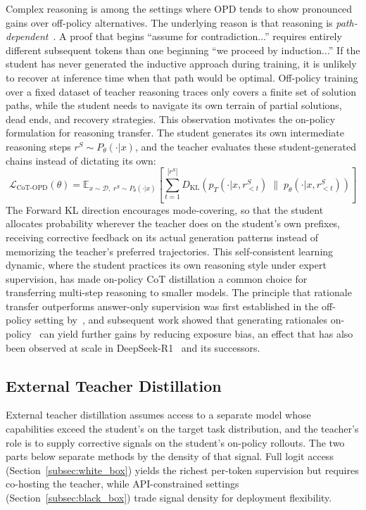 \documentclass{article} %
\newcommand{\E}{\mathbb{E}}
\newcommand{\KL}{D_{\mathrm{KL}}}
\newcommand{\ptheta}{p_\theta}
\newcommand{\pteacher}{p_T}
\newcommand{\loss}{\mathcal{L}}
\begin{document}
Complex reasoning is among the settings where OPD tends to show pronounced gains over off-policy alternatives. The underlying reason is that reasoning is \emph{path-dependent}~\citep{2306.13649}. A proof that begins ``assume for contradiction...'' requires entirely different subsequent tokens than one beginning ``we proceed by induction...'' If the student has never generated the inductive approach during training, it is unlikely to recover at inference time when that path would be optimal. Off-policy training over a fixed dataset of teacher reasoning traces only covers a finite set of solution paths, while the student needs to navigate its own terrain of partial solutions, dead ends, and recovery strategies. This observation motivates the on-policy formulation for reasoning transfer. The student generates its own intermediate reasoning steps $r^S \sim P_\theta(\cdot|x)$, and the teacher evaluates these student-generated chains instead of dictating its own:
\begin{equation*}
    \loss_{\text{CoT-OPD}}(\theta) = \E_{x \sim \mathcal{D},\; r^S \sim P_\theta(\cdot|x)} \left[ \sum_{t=1}^{|r^S|} \KL\!\left( \pteacher(\cdot|x, r^S_{<t}) \;\|\; \ptheta(\cdot|x, r^S_{<t}) \right) \right]
\end{equation*}
The Forward KL direction encourages mode-covering, so that the student allocates probability wherever the teacher does on the student's own prefixes, receiving corrective feedback on its actual generation patterns instead of memorizing the teacher's preferred trajectories. This self-consistent learning dynamic, where the student practices its own reasoning style under expert supervision, has made on-policy CoT distillation a common choice for transferring multi-step reasoning to smaller models. The principle that rationale transfer outperforms answer-only supervision was first established in the off-policy setting by~\citet{2305.02301}, and subsequent work showed that generating rationales on-policy~\citep{2306.13649} can yield further gains by reducing exposure bias, an effect that has also been observed at scale in DeepSeek-R1~\citep{2501.12948} and its successors.

\subsection{External Teacher Distillation}
\label{subsec:external_teacher}

External teacher distillation assumes access to a separate model whose capabilities exceed the student's on the target task distribution, and the teacher's role is to supply corrective signals on the student's on-policy rollouts. The two parts below separate methods by the density of that signal. Full logit access (Section~\ref{subsec:white_box}) yields the richest per-token supervision but requires co-hosting the teacher, while API-constrained settings (Section~\ref{subsec:black_box}) trade signal density for deployment flexibility.
\end{document}
